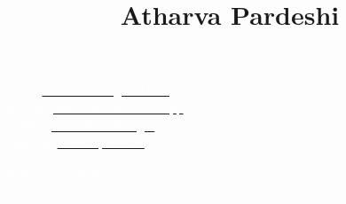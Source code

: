 \documentclass[11pt, oneside, a4paper, titlepage]{article}
\title{Atharva Pardeshi}
\date{}
\begin{document}
\begin{tcolorbox}
  \begin{minipage}{4.5cm}
    \textcolor{white}{Email-}\href{mailto:atharva.exe@gmail.com}{\underline{\textcolor{white}{atharva.exe@gmail.com}}} \\
    \textcolor{white}{Website-}\href{https://atharvaworks.vercel.app}{\underline{\textcolor{white}{atharvaworks.vercel.app}}} \\
    \textcolor{white}{GitHub-}\href{https://github.com/SazedWorldbringer}{\underline{\textcolor{white}{SazedWorldbringer}}} \\
    \textcolor{white}{Linkedin-}\href{https://linkedin.com/in/atharvapardeshi}{\underline{\textcolor{white}{atharvapardeshi}}} \\
  \end{minipage}
  \begin{minipage}{15cm}
    \begin{center}
      \Huge{\textcolor{white}{Atharva Pardeshi}} \\
      \vspace*{0.5cm}
      \Large{\textcolor{white}{\textit{Software Developer}}}
    \end{center}
  \end{minipage}
\end{tcolorbox}
\end{document}

